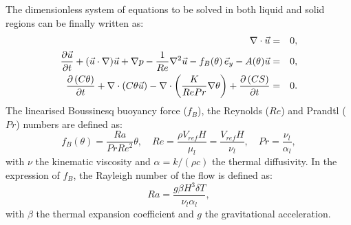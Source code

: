 
The dimensionless system of equations to be solved in both liquid and solid regions can be finally written as:
\begin{eqnarray}
\nabla\cdot \vec{u}&=&0, \label{eq-qmvt} \\ \vspace{0.2cm}
 \frac{\partial \vec{u}}{\partial t} + {(\vec{u}\cdot\nabla) \vec{u}} +\nabla p -\frac{1}{Re}{\nabla^2 \vec{u}} 
 - f_B(\theta)\, \vec{e}_y - A(\theta) \vec{u}&=&0, \label{eq-qmvt-2} \\ \vspace{0.2cm}
 \frac{\partial \left(C \theta\right)}{\partial t} + \nabla \cdot\left( C \theta \vec{u}\right) -
 \nabla \cdot\left( \frac{K}{Re Pr} \nabla \theta \right) +  \frac{\partial \left(C S\right)}{\partial t}  &=& 0. \label{eq-energ} 
\end{eqnarray}
The linearised Boussinesq buoyancy force ($f_B$), the Reynolds ($Re$) and Prandtl ($Pr$) numbers are defined as:
\begin{equation}\label{eq-RePr}
f_B(\theta) = \frac{Ra}{Pr Re^2} \theta, \quad Re = \frac{\rho V_{ref} H}{\mu_l}=  \frac{V_{ref} H}{\nu_l} , \quad Pr = \frac{\nu_l}{\alpha_l},
\end{equation}
with $\nu$ the kinematic viscosity and $\alpha = k/(\rho c)$  the thermal diffusivity. In the expression of $f_B$, the Rayleigh number of the flow is defined as:
\begin{equation}
\label{eq-Rayleigh}
Ra = \frac{g \beta H^3 \delta T}{\nu_l \alpha_l},
\end{equation}
with $\beta$ the thermal expansion coefficient and $g$ the gravitational acceleration.

